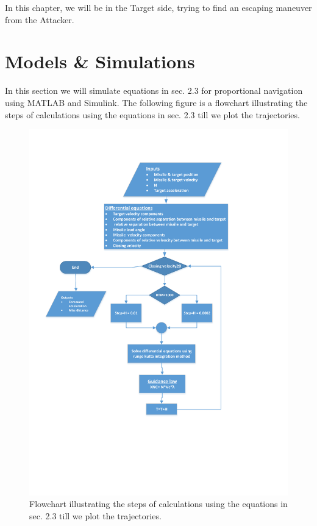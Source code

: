 In this chapter, we will be in the Target side, trying  to find an escaping maneuver from the Attacker.


\section{Models \& Simulations}

In this section we will simulate equations in sec. 2.3 for proportional navigation using MATLAB and Simulink.
The following figure is a flowchart illustrating the steps of calculations using the equations in sec. 2.3  till we plot the trajectories.

\begin{figure}[H]
	\centering
	\includegraphics[scale = 0.5]{fig/FlowchartPN.pdf}
	\caption{Flowchart illustrating the steps of calculations using the equations in sec. 2.3  till we plot the trajectories.}
	\label{flowchart PN}
\end{figure}



